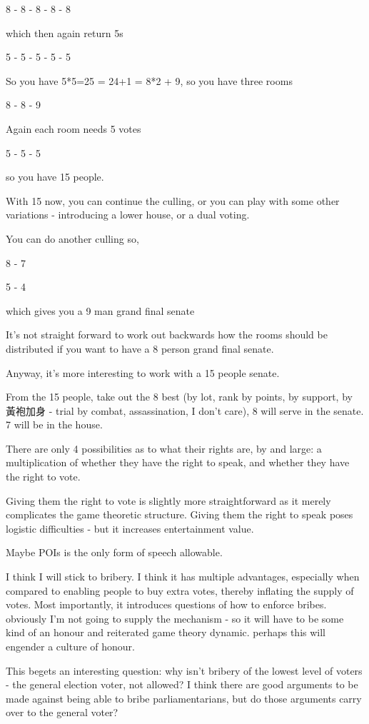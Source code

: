 \documentclass[9pt]{article}
\begin{document}
8 - 8 - 8 - 8 - 8

which then again return 5s

5 - 5 - 5 - 5 - 5

So you have 5*5=25 = 24+1 = 8*2 + 9, so you have three rooms

8 - 8 - 9

Again each room needs 5 votes

5 - 5 - 5

so you have 15 people.

With 15 now, you can continue the culling, or you can play with some other variations - introducing a lower house, or a dual voting.

You can do another culling so,

8 - 7

5 - 4

which gives you a 9 man grand final senate

It's not straight forward to work out backwards how the rooms should be distributed if you want to have a 8 person grand final senate.

Anyway, it's more interesting to work with a 15 people senate.

From the 15 people, take out the 8 best (by lot, rank by points, by support, by 黃袍加身 - trial by combat, assassination, I don't care), 8 will serve in the senate. 7 will be in the house.

There are only 4 possibilities as to what their rights are, by and large: a multiplication of whether they have the right to speak, and whether they have the right to vote.

Giving them the right to vote is slightly more straightforward as it merely complicates the game theoretic structure. Giving them the right to speak poses logistic difficulties - but it increases entertainment value.

Maybe POIs is the only form of speech allowable.

I think I will stick to bribery. I think it has multiple advantages, especially when compared to enabling people to buy extra votes, thereby inflating the supply of votes. Most importantly, it introduces questions of how to enforce bribes. obviously I'm not going to supply the mechanism - so it will have to be some kind of an honour and reiterated game theory dynamic. perhaps this will engender a culture of honour.

This begets an interesting question: why isn't bribery of the lowest level of voters - the general election voter, not allowed? I think there are good arguments to be made against being able to bribe parliamentarians, but do those arguments carry over to the general voter?
\end{document}
